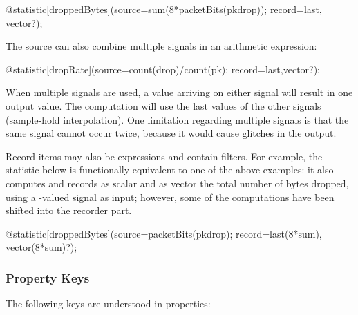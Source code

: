 \begin{ned}
@statistic[droppedBytes](source=sum(8*packetBits(pkdrop)); record=last,
vector?);
\end{ned}

The source can also combine multiple signals in an arithmetic expression:

\begin{ned}
@statistic[dropRate](source=count(drop)/count(pk); record=last,vector?);
\end{ned}

When multiple signals are used, a value arriving on either signal will
result in one output value. The computation will use the last values of the
other signals (sample-hold interpolation). One limitation regarding
multiple signals is that the same signal cannot occur twice, because it
would cause glitches in the output.

Record items may also be expressions and contain filters. For example, the
statistic below is functionally equivalent to one of the above examples: it
also computes and records as scalar and as vector the total number of bytes
dropped, using a -valued signal as input; however, some of
the computations have been shifted into the recorder part.

\begin{ned}
@statistic[droppedBytes](source=packetBits(pkdrop); record=last(8*sum),
vector(8*sum)?);
\end{ned}


\subsubsection{Property Keys}
\label{sec:simple-modules:declared-statistics:property-keys}

The following keys are understood in  properties:

